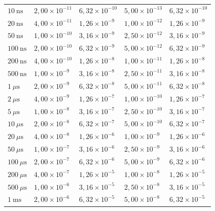 \begin{table}[h!]
\begin{tabular}{l|l|l|l||l}
    \(10~\text{ns}\) & \(2,00\times 10^{-11}\) & \(6,32\times 10^{-10}\) & \(5,00\times 10^{-13}\) & \(6,32\times 10^{-10}\) \\
    \(20~\text{ns}\) & \(4,00\times 10^{-11}\) & \(1,26\times 10^{-9}\) & \(1,00\times 10^{-12}\) & \(1,26\times 10^{-9}\) \\
    \(50~\text{ns}\) & \(1,00\times 10^{-10}\) & \(3,16\times 10^{-9}\) & \(2,50\times 10^{-12}\) & \(3,16\times 10^{-9}\) \\
    \(100~\text{ns}\) & \(2,00\times 10^{-10}\) & \(6,32\times 10^{-9}\) & \(5,00\times 10^{-12}\) & \(6,32\times 10^{-9}\) \\
    \(200~\text{ns}\) & \(4,00\times 10^{-10}\) & \(1,26\times 10^{-8}\) & \(1,00\times 10^{-11}\) & \(1,26\times 10^{-8}\) \\
    \(500~\text{ns}\) & \(1,00\times 10^{-9}\) & \(3,16\times 10^{-8}\) & \(2,50\times 10^{-11}\) & \(3,16\times 10^{-8}\) \\
    \(1~\mu\text{s}\) & \(2,00\times 10^{-9}\) & \(6,32\times 10^{-8}\) & \(5,00\times 10^{-11}\) & \(6,32\times 10^{-8}\) \\
    \(2~\mu\text{s}\) & \(4,00\times 10^{-9}\) & \(1,26\times 10^{-7}\) & \(1,00\times 10^{-10}\) & \(1,26\times 10^{-7}\) \\
    \(5~\mu\text{s}\) & \(1,00\times 10^{-8}\) & \(3,16\times 10^{-7}\) & \(2,50\times 10^{-10}\) & \(3,16\times 10^{-7}\) \\
    \(10~\mu\text{s}\) & \(2,00\times 10^{-8}\) & \(6,32\times 10^{-7}\) & \(5,00\times 10^{-10}\) & \(6,32\times 10^{-7}\) \\
    \(20~\mu\text{s}\) & \(4,00\times 10^{-8}\) & \(1,26\times 10^{-6}\) & \(1,00\times 10^{-9}\) & \(1,26\times 10^{-6}\) \\
    \(50~\mu\text{s}\) & \(1,00\times 10^{-7}\) & \(3,16\times 10^{-6}\) & \(2,50\times 10^{-9}\) & \(3,16\times 10^{-6}\) \\
    \(100~\mu\text{s}\) & \(2,00\times 10^{-7}\) & \(6,32\times 10^{-6}\) & \(5,00\times 10^{-9}\) & \(6,32\times 10^{-6}\) \\
    \(200~\mu\text{s}\) & \(4,00\times 10^{-7}\) & \(1,26\times 10^{-5}\) & \(1,00\times 10^{-8}\) & \(1,26\times 10^{-5}\) \\
    \(500~\mu\text{s}\) & \(1,00\times 10^{-6}\) & \(3,16\times 10^{-5}\) & \(2,50\times 10^{-8}\) & \(3,16\times 10^{-5}\) \\
    \(1~\text{ms}\) & \(2,00\times 10^{-6}\) & \(6,32\times 10^{-5}\) & \(5,00\times 10^{-8}\) & \(6,32\times 10^{-5}\) \\

\end{tabular}
\end{table}
